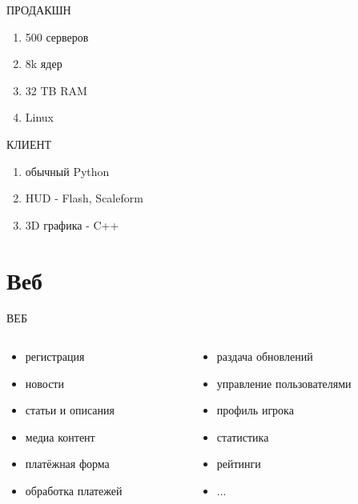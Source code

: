 \documentclass[aspectratio=169]{beamer}
\begin{document}
\begin{frame}{ПРОДАКШН}
    \begin{enumerate}
        \item 500 серверов
        \item 8k ядер
        \item 32 TB RAM 
        \item Linux
    \end{enumerate}
\end{frame}

\begin{frame}{КЛИЕНТ}
    \begin{enumerate}
        \item обычный Python
        \item HUD - Flash, Scaleform
        \item 3D графика - C++
    \end{enumerate}
\end{frame}

\section{Веб}
\begin{frame}{ВЕБ}
    \begin{columns}
        \begin{column}{0.4\textwidth}
        \begin{itemize}
            \item регистрация
            \item новости
            \item статьи и описания
            \item медиа контент
            \item платёжная форма
            \item обработка платежей
        \end{itemize}
        \end{column}
    
        \begin{column}{0.4\textwidth}
        \begin{itemize}
            \item раздача обновлений
            \item управление пользователями
            \item профиль игрока
            \item статистика
            \item рейтинги
            \item ...
        \end{itemize}
        \end{column}
    \end{columns}
\end{frame}
\end{document}
